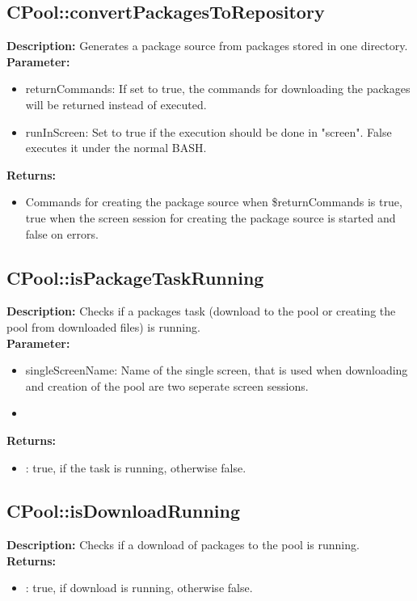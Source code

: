 \subsection{CPool::convertPackagesToRepository}
\textbf{Description:} Generates a package source from packages stored in one directory.\\
\textbf{Parameter:}
\begin{itemize}
\item returnCommands: If set to true, the commands for downloading the packages will be returned instead of executed.
\item runInScreen: Set to true if the execution should be done in "screen". False executes it under the normal BASH.
\end{itemize}
\textbf{Returns:}
\begin{itemize}
\item Commands for creating the package source when \$returnCommands is true, true when the screen session for creating the package source is started and false on errors.
\end{itemize}

\subsection{CPool::isPackageTaskRunning}
\textbf{Description:} Checks if a packages task (download to the pool or creating the pool from downloaded files) is running.\\
\textbf{Parameter:}
\begin{itemize}
\item singleScreenName: Name of the single screen, that is used when downloading and creation of the pool are two seperate screen sessions.
\item 
\end{itemize}
\textbf{Returns:}
\begin{itemize}
\item : true, if the task is running, otherwise false.
\end{itemize}

\subsection{CPool::isDownloadRunning}
\textbf{Description:} Checks if a download of packages to the pool is running.\\
\textbf{Returns:}
\begin{itemize}
\item : true, if download is running, otherwise false.
\end{itemize}

